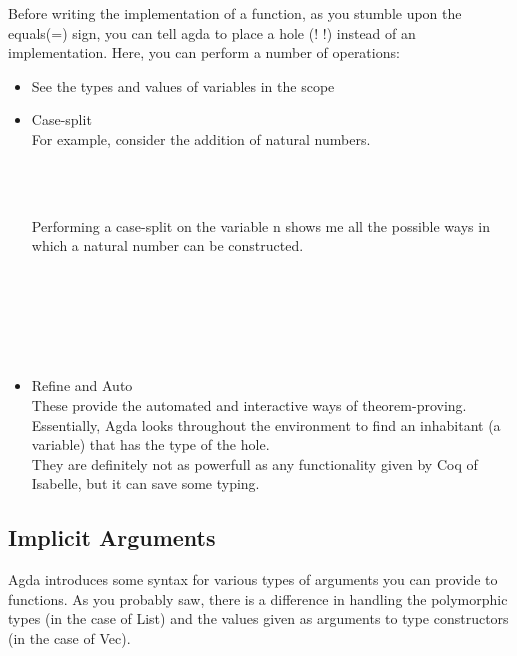 \documentclass[12pt,twoside,notitlepage]{report}
\begin{document}
Before writing the implementation of a function, as you stumble upon the equals(=) sign,
you can tell agda to place a hole ({! !}) instead of an implementation. Here, you can
perform a number of operations:
  \begin {itemize}
  \item{See the types and values of variables in the scope}
  \item{Case-split} \\
    For example, consider the addition of natural numbers. \\
    \begin{code}
    \\
\>\AgdaFunction{\_+\_} \AgdaSymbol{:}     \<%
\\
\> \AgdaFunction{+}  \AgdaSymbol{=} \<%
    \end{code}
    Performing a case-split on the variable n shows me all the possible ways in which a natural number can be constructed. \\
   \begin{code}
   \\
\>\AgdaFunction{\_+\_} \AgdaSymbol{:}     \<%
\\
\> \AgdaFunction{+}  \AgdaSymbol{=} \<%
\\
\>  \AgdaFunction{+}  \AgdaSymbol{=} \<%
\end{code}\\
  \item{Refine and Auto} \\
    These provide the automated and interactive ways of theorem-proving. Essentially, Agda looks throughout the environment to find
    an inhabitant (a variable) that has the type of the hole. \\
    They are definitely not as powerfull as any functionality given by Coq of Isabelle, but it can save some typing.

  \end{itemize}

\subsection{Implicit Arguments}
  Agda introduces some syntax for various types of arguments you can provide to functions. As you probably saw,
  there is a difference in handling the polymorphic types (in the case of List) and the values given as arguments
  to type constructors (in the case of Vec). \\
\end{document}
